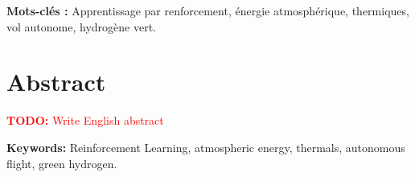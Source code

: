 \documentclass[a4paper, 12pt, oneside]{report}
\newcommand{\todo}[1]{\textcolor{red}{\textbf{TODO:} #1}}
\begin{document}
\textbf{Mots-clés :} Apprentissage par renforcement, énergie atmosphérique, thermiques, vol autonome, hydrogène vert.

\chapter*{Abstract}
\todo{Write English abstract}

\textbf{Keywords:} Reinforcement Learning, atmospheric energy, thermals, autonomous flight, green hydrogen.

\tableofcontents
\listoffigures
\listoftables

\cleardoublepage
{}





\appendix
% 
\end{document}
